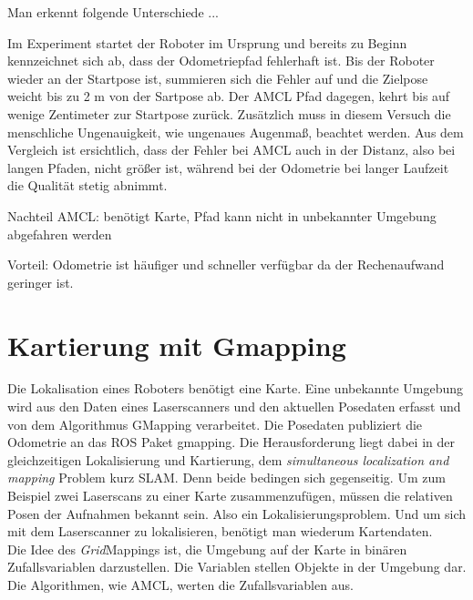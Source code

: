\documentclass[11pt,a4paper]{article}
\begin{document}
{Man erkennt folgende Unterschiede ...

Im Experiment startet der Roboter im Ursprung und bereits zu Beginn kennzeichnet sich ab, dass der Odometriepfad fehlerhaft ist. Bis der Roboter wieder an der Startpose ist, summieren sich die Fehler auf und die Zielpose weicht bis zu 2 m von der Sartpose ab. Der AMCL Pfad dagegen, kehrt bis auf wenige Zentimeter zur Startpose zur\"uck. Zus\"atzlich muss in diesem Versuch die menschliche Ungenauigkeit, wie ungenaues Augenma{\ss}, beachtet werden. Aus dem Vergleich ist ersichtlich, dass der Fehler bei AMCL auch in der Distanz, also bei langen Pfaden, nicht gr\"o{\ss}er ist, w\"ahrend bei der Odometrie bei langer Laufzeit die Qualit\"at stetig abnimmt.


Nachteil AMCL: benötigt Karte, Pfad kann nicht in unbekannter Umgebung abgefahren werden

Vorteil: Odometrie ist h\"aufiger und schneller verf\"ugbar da der Rechenaufwand geringer ist. 


\section{Kartierung mit Gmapping} \cite{gmapping}
Die Lokalisation eines Roboters ben\"otigt eine Karte. Eine unbekannte Umgebung wird aus den Daten eines Laserscanners und den aktuellen Posedaten erfasst und von dem Algorithmus GMapping verarbeitet. Die Posedaten publiziert die Odometrie an das ROS Paket gmapping.
Die Herausforderung liegt dabei in der gleichzeitigen Lokalisierung und Kartierung, dem \textit{simultaneous localization and mapping} Problem kurz SLAM. Denn beide bedingen sich gegenseitig. Um zum Beispiel zwei Laserscans zu einer Karte zusammenzuf\"ugen, m\"ussen die relativen Posen der Aufnahmen bekannt sein. Also ein Lokalisierungsproblem. Und um sich mit dem Laserscanner zu lokalisieren, ben\"otigt man wiederum Kartendaten. \\

Die Idee des  \textit{Grid}Mappings ist, die Umgebung auf der Karte in bin\"aren Zufallsvariablen darzustellen. Die Variablen stellen Objekte in der Umgebung dar. Die Algorithmen, wie AMCL, werten die Zufallsvariablen aus. 


}
\end{document}
